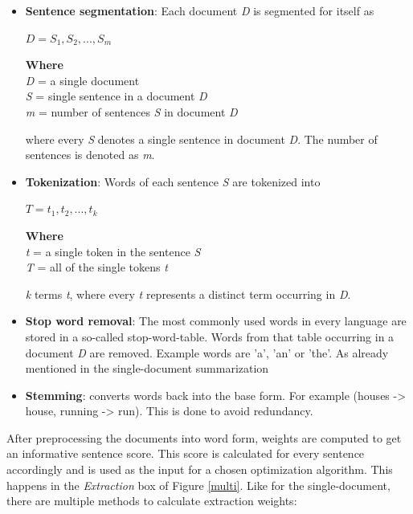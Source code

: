  
\begin{itemize}
	\item \textbf{Sentence segmentation}: Each document \textit{D} is segmented for itself as 
	\begin{tcolorbox}
		\begin{center}
		\(D = {S_{1}, S_{2},..., S_{m}}\)
		\end{center}
	\end{tcolorbox}
	\begin{tcolorbox}
		\textbf{Where}\\
		\textit{D} = a single document \\
		\textit{S} = single sentence in a document \textit{D}\\
		\textit{m} = number of sentences \textit{S} in document \textit{D}
	\end{tcolorbox}
	where every \textit{S} denotes a single sentence in document \textit{D}. The number of sentences is denoted as \textit{m}.
	\item \textbf{Tokenization}: Words of each sentence \textit{S} are tokenized into 
	\begin{tcolorbox}
		\begin{center}
			\(T = {t_{1}, t_{2},..., t_{k}}\) 
		\end{center}
	\end{tcolorbox}
	\begin{tcolorbox}
		\textbf{Where} \\
		\textit{t} = a single token in the sentence \textit{S} \\
		\textit{T} = all of the single tokens \textit{t}
	\end{tcolorbox}
	
	\textit{k} terms \textit{t}, where every \textit{t} represents a distinct term occurring in \textit{D}. 
	\item \textbf{Stop word removal}: The most commonly used words in every language are stored in a so-called stop-word-table. Words from that table occurring in a document \textit{D} are removed. Example words are 'a', 'an' or 'the'. As already mentioned in the single-document summarization
	\item \textbf{Stemming}: converts words back into the base form. For example (houses -> house, running -> run). This is done to avoid redundancy.
\end{itemize}
 
 
After preprocessing the documents into word form, weights are computed to get an informative sentence score. This score is calculated for every sentence accordingly and is used as the input for a chosen optimization algorithm. This happens in the \textit{Extraction} box of Figure \ref{multi}. Like for the single-document, there are multiple methods to calculate extraction weights:

